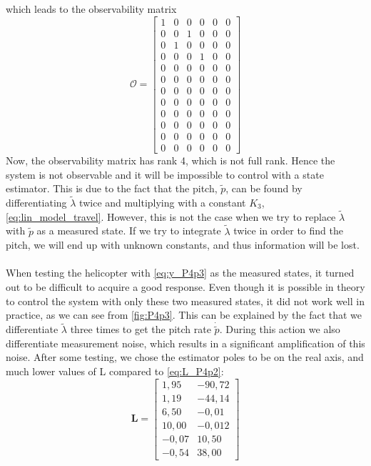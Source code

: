 which leads to the observability matrix
\begin{equation}\nonumber
    \mathcal {O}=
    {\begin{bmatrix}
        1 & 0 & 0 & 0 & 0 & 0\\
        0 & 0 & 1 & 0 & 0 & 0\\
        0 & 1 & 0 & 0 & 0 & 0\\
        0 & 0 & 0 & 1 & 0 & 0\\
        0 & 0 & 0 & 0 & 0 & 0\\
        0 & 0 & 0 & 0 & 0 & 0\\
        0 & 0 & 0 & 0 & 0 & 0\\
        0 & 0 & 0 & 0 & 0 & 0\\
        0 & 0 & 0 & 0 & 0 & 0\\
        0 & 0 & 0 & 0 & 0 & 0\\
        0 & 0 & 0 & 0 & 0 & 0\\
        0 & 0 & 0 & 0 & 0 & 0
    \end{bmatrix}}
\end{equation}
Now, the observability matrix has rank 4, which is not full rank. Hence the system is not observable and it will be impossible to control with a state estimator. This is due to the fact that the pitch, $\tilde{p}$, can be found by differentiating $\tilde{\lambda}$ twice and multiplying with a constant $K_3$, \eqref{eq:lin_model_travel}. However, this is not the case when we try to replace $\tilde{\lambda}$ with $\tilde{p}$ as a measured state. If we try to integrate $\tilde{\lambda}$ twice in order to find the pitch, we will end up with unknown constants, and thus information will be lost.\\
\\
When testing the helicopter with \eqref{eq:y_P4p3} as the measured states, it turned out to be difficult to acquire a good response. Even though it is possible in theory to control the system with only these two measured states, it did not work well in practice, as we can see from \cref{fig:P4p3}. This can be explained by the fact that we differentiate $\tilde{\lambda}$ three times to get the pitch rate $\dot{\tilde{p}}$. During this action we also differentiate measurement noise, which results in a significant amplification of this noise. After some testing, we chose the estimator poles to be on the real axis, and much lower values of L compared to \eqref{eq:L_P4p2}:
\begin{equation}\nonumber
\mathbf{L} = \begin{bmatrix}
1,95 & -90,72\\
1,19 & -44,14\\
6,50 & -0,01\\
10,00 &	-0,012\\
-0,07 &	10,50\\
-0,54 &	38,00
\end{bmatrix}
\end{equation}
